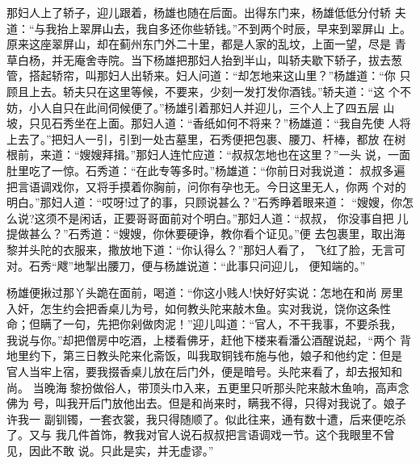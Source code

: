 那妇人上了轿子，迎儿跟着，杨雄也随在后面。出得东门来，杨雄低低分付轿
夫道：“与我抬上翠屏山去，我自多还你些轿钱。”不到两个时辰，早来到翠屏山
上。原来这座翠屏山，却在蓟州东门外二十里，都是人家的乱坟，上面一望，尽是
青草白杨，并无庵舍寺院。当下杨雄把那妇人抬到半山，叫轿夫歇下轿子，拔去葱
管，搭起轿帘，叫那妇人出轿来。妇人问道：“却怎地来这山里？”杨雄道：“你
只顾且上去。轿夫只在这里等候，不要来，少刻一发打发你酒钱。”轿夫道：“这
个不妨，小人自只在此间伺候便了。”杨雄引着那妇人并迎儿，三个人上了四五层
山坡，只见石秀坐在上面。那妇人道：“香纸如何不将来？”杨雄道：“我自先使
人将上去了。”把妇人一引，引到一处古墓里，石秀便把包裹、腰刀、杆棒，都放
在树根前，来道：“嫂嫂拜揖。”那妇人连忙应道：“叔叔怎地也在这里？”一头
说，一面肚里吃了一惊。石秀道：“在此专等多时。”杨雄道：“你前日对我说道：
叔叔多遍把言语调戏你，又将手摸着你胸前，问你有孕也无。今日这里无人，你两
个对的明白。”那妇人道：“哎呀!过了的事，只顾说甚么？”石秀睁着眼来道：
“嫂嫂，你怎么说?这须不是闲话，正要哥哥面前对个明白。”那妇人道：“叔叔，
你没事自把儿提做甚么？”石秀道：“嫂嫂，你休要硬诤，教你看个证见。”便
去包裹里，取出海黎并头陀的衣服来，撒放地下道：“你认得么？”那妇人看了，
飞红了脸，无言可对。石秀“飕”地掣出腰刀，便与杨雄说道：“此事只问迎儿，
便知端的。”

杨雄便揪过那丫头跪在面前，喝道：“你这小贱人!快好好实说：怎地在和尚
房里入奸，怎生约会把香桌儿为号，如何教头陀来敲木鱼。实对我说，饶你这条性
命；但瞒了一句，先把你剁做肉泥！”迎儿叫道：“官人，不干我事，不要杀我，
我说与你。”却把僧房中吃酒，上楼看佛牙，赶他下楼来看潘公酒醒说起，“两个
背地里约下，第三日教头陀来化斋饭，叫我取铜钱布施与他，娘子和他约定：但是
官人当牢上宿，要我掇香桌儿放在后门外，便是暗号。头陀来看了，却去报知和尚。
当晚海黎扮做俗人，带顶头巾入来，五更里只听那头陀来敲木鱼响，高声念佛为
号，叫我开后门放他出去。但是和尚来时，瞒我不得，只得对我说了。娘子许我一
副钏镯，一套衣裳，我只得随顺了。似此往来，通有数十遭，后来便吃杀了。又与
我几件首饰，教我对官人说石叔叔把言语调戏一节。这个我眼里不曾见，因此不敢
说。只此是实，并无虚谬。”

